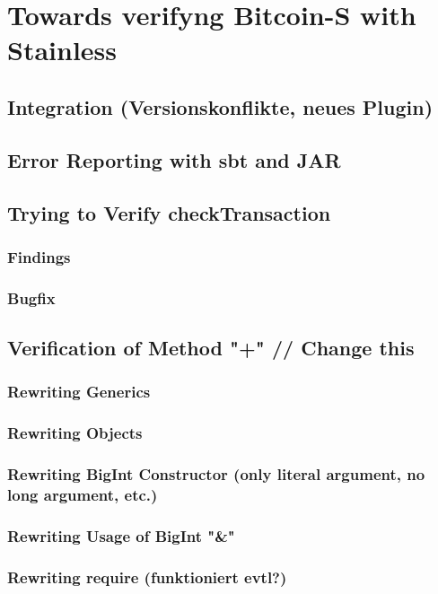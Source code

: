 \chapter{Towards verifyng Bitcoin-S with Stainless}
\label{chap:connecting}

\section{Integration (Versionskonflikte, neues Plugin)}


\section{Error Reporting with sbt and JAR}


\section{Trying to Verify checkTransaction}

\subsection{Findings}

\subsection{Bugfix}


\section{Verification of Method "+" // Change this}

\subsection{Rewriting Generics}

\subsection{Rewriting Objects}

\subsection{Rewriting BigInt Constructor (only literal argument, no long argument, etc.)}

\subsection{Rewriting Usage of BigInt "\&"}

\subsection{Rewriting require (funktioniert evtl?)}
